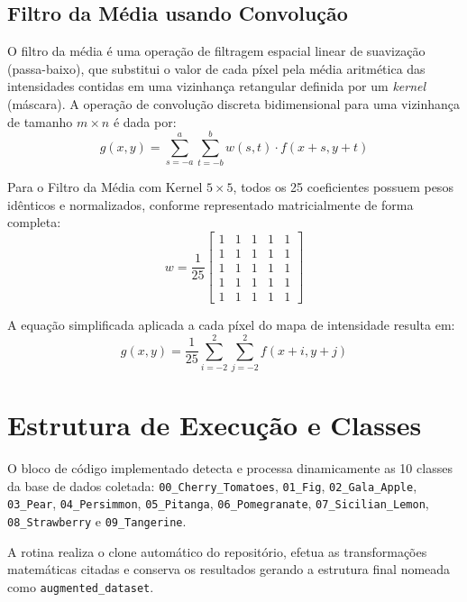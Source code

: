 \subsection{Filtro da Média usando Convolução}
O filtro da média é uma operação de filtragem espacial linear de suavização (passa-baixo), que substitui o valor de cada píxel pela média aritmética das intensidades contidas em uma vizinhança retangular definida por um \textit{kernel} (máscara). A operação de convolução discreta bidimensional para uma vizinhança de tamanho $m \times n$ é dada por:
\begin{equation}
g(x, y) = \sum_{s=-a}^{a} \sum_{t=-b}^{b} w(s, t) \cdot f(x+s, y+t)
\end{equation}

Para o Filtro da Média com Kernel $5 \times 5$, todos os 25 coeficientes possuem pesos idênticos e normalizados, conforme representado matricialmente de forma completa:
\begin{equation}
w = \frac{1}{25} \begin{bmatrix}
1 & 1 & 1 & 1 & 1 \\
1 & 1 & 1 & 1 & 1 \\
1 & 1 & 1 & 1 & 1 \\
1 & 1 & 1 & 1 & 1 \\
1 & 1 & 1 & 1 & 1
\end{bmatrix}
\end{equation}

A equação simplificada aplicada a cada píxel do mapa de intensidade resulta em:
\begin{equation}
g(x, y) = \frac{1}{25} \sum_{i=-2}^{2} \sum_{j=-2}^{2} f(x+i, y+j)
\end{equation}

\section{Estrutura de Execução e Classes}
O bloco de código implementado detecta e processa dinamicamente as 10 classes da base de dados coletada:
\texttt{00\_Cherry\_Tomatoes}, \texttt{01\_Fig}, \texttt{02\_Gala\_Apple}, \texttt{03\_Pear}, \texttt{04\_Persimmon}, \texttt{05\_Pitanga}, \texttt{06\_Pomegranate}, \texttt{07\_Sicilian\_Lemon}, \texttt{08\_Strawberry} e \texttt{09\_Tangerine}.

A rotina realiza o clone automático do repositório, efetua as transformações matemáticas citadas e conserva os resultados gerando a estrutura final nomeada como \texttt{augmented\_dataset}.

